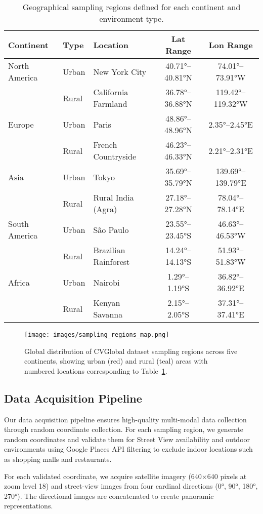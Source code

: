 \begin{table}[t]
\centering
\caption{Geographical sampling regions defined for each continent and environment type.}
\label{tab:sampling_regions}
\begin{tabular}{lllcc}
\toprule
\textbf{Continent} & \textbf{Type} & \textbf{Location} & \textbf{Lat Range} & \textbf{Lon Range} \\
\midrule
North America & Urban & New York City & 40.71°--40.81°N & 74.01°--73.91°W \\
              & Rural & California Farmland & 36.78°--36.88°N & 119.42°--119.32°W \\
\midrule
Europe & Urban & Paris & 48.86°--48.96°N & 2.35°--2.45°E \\
       & Rural & French Countryside & 46.23°--46.33°N & 2.21°--2.31°E \\
\midrule
Asia & Urban & Tokyo & 35.69°--35.79°N & 139.69°--139.79°E \\
     & Rural & Rural India (Agra) & 27.18°--27.28°N & 78.04°--78.14°E \\
\midrule
South America & Urban & São Paulo & 23.55°--23.45°S & 46.63°--46.53°W \\
              & Rural & Brazilian Rainforest & 14.24°--14.13°S & 51.93°--51.83°W \\
\midrule
Africa & Urban & Nairobi & 1.29°--1.19°S & 36.82°--36.92°E \\
       & Rural & Kenyan Savanna & 2.15°--2.05°S & 37.31°--37.41°E \\
\bottomrule
\end{tabular}
\end{table}

\begin{figure}[t]
    \centering
    \texttt{[image: images/sampling\_regions\_map.png]}
    \caption{Global distribution of CVGlobal dataset sampling regions across five continents, showing urban (red) and rural (teal) areas with numbered locations corresponding to Table~\ref{tab:sampling_regions}.}
    \label{fig:sampling_regions}
\end{figure}

\subsection{Data Acquisition Pipeline}

Our data acquisition pipeline ensures high-quality multi-modal data collection through random coordinate collection. For each sampling region, we generate random coordinates and validate them for Street View availability and outdoor environments using Google Places API filtering to exclude indoor locations such as shopping malls and restaurants.

For each validated coordinate, we acquire satellite imagery (640×640 pixels at zoom level 18) and street-view images from four cardinal directions (0°, 90°, 180°, 270°). The directional images are concatenated to create panoramic representations.